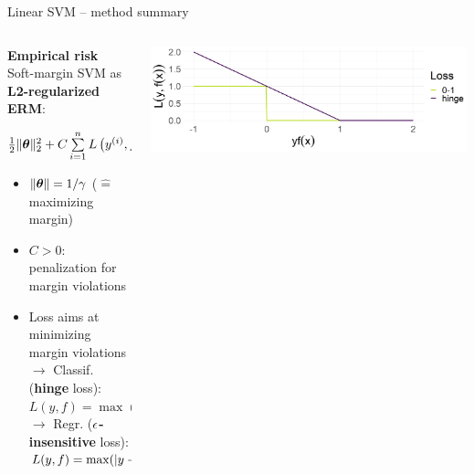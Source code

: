 \documentclass[11pt,compress,t,notes=noshow, xcolor=table]{beamer}
\newcommand{\highlight}[1]{\textcolor{hlcol}{\textbf{#1}}}
\begin{document}
\begin{frame2}{Linear SVM -- method summary}
\begin{columns}[T, totalwidth = \textwidth]
\begin{column}{0.61\textwidth}
\highlight{Empirical risk} ~~ Soft-margin SVM as \textbf{L2-regularized ERM}: 
   \centerline{$\frac{1}{2} \|\bm{\theta}\|_2^2 + C \sum\limits_{i=1}^n L\left(y^{(i)}, f\left(\mathbf{x}^{(i)}\right)\right)$}
   \vspace{-\topsep}
\begin{itemize}
\setlength{\parskip}{0pt} 
\setlength{\itemsep}{0pt plus 1pt}
  \item $\|\bm{\theta}\| = 1 / \gamma$ ($\hat{=}$ maximizing margin) \\
  \item $C > 0$: penalization for margin violations
  \item Loss aims at minimizing margin violations\\
  $\rightarrow$ Classif. (\textbf{hinge} loss): $L(y,f) = \max(1-yf, 0)$ \\
  $\rightarrow$ Regr. (\textbf{$\epsilon$-insensitive} loss):   $L(y,f) = \max(|y-f| - \epsilon, 0)$ 
\end{itemize}
\vspace{-\topsep}
\end{column}
\begin{column}{0.38\textwidth}
\centering
\includegraphics[height=\textwidth, keepaspectratio=true]{
figure/plot_loss_hinge.png}

\end{column}
\end{columns}
\end{frame2}
\end{document}
